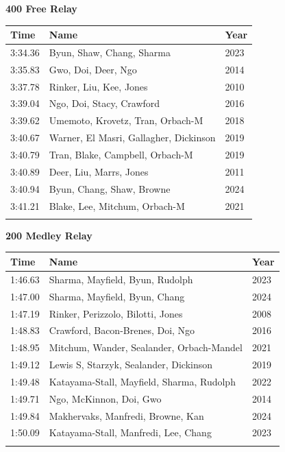 \noindent\begin{minipage}[t]{0.98\textwidth}
\centering
\textbf{\textcolor{teamprimary}{400 Free Relay}}\par
\vspace{0.5em}
\centering
\small
\renewcommand{\arraystretch}{1.0}
\setlength{\tabcolsep}{4pt}
\begin{tabular}{@{}p{4.5cm}p{8.5cm}p{2.5cm}@{}}
\toprule
\textbf{Time} & \textbf{Name} & \textbf{Year} \\
\midrule
3:34.36 & Byun, Shaw, Chang, Sharma & 2023 \\
3:35.83 & Gwo, Doi, Deer, Ngo & 2014 \\
3:37.78 & Rinker, Liu, Kee, Jones & 2010 \\
3:39.04 & Ngo, Doi, Stacy, Crawford & 2016 \\
3:39.62 & Umemoto, Krovetz, Tran, Orbach-M & 2018 \\
3:40.67 & Warner, El Masri, Gallagher, Dickinson & 2019 \\
3:40.79 & Tran, Blake, Campbell, Orbach-M & 2019 \\
3:40.89 & Deer, Liu, Marrs, Jones & 2011 \\
3:40.94 & Byun, Chang, Shaw, Browne & 2024 \\
3:41.21 & Blake, Lee, Mitchum, Orbach-M & 2021 \\
\bottomrule
\vspace{0.5em}
\end{tabular}
\end{minipage}
\vspace{1.2em}
\noindent\begin{minipage}[t]{0.98\textwidth}
\centering
\textbf{\textcolor{teamprimary}{200 Medley Relay}}\par
\vspace{0.5em}
\centering
\small
\renewcommand{\arraystretch}{1.0}
\setlength{\tabcolsep}{4pt}
\begin{tabular}{@{}p{4.5cm}p{8.5cm}p{2.5cm}@{}}
\toprule
\textbf{Time} & \textbf{Name} & \textbf{Year} \\
\midrule
1:46.63 & Sharma, Mayfield, Byun, Rudolph & 2023 \\
1:47.00 & Sharma, Mayfield, Byun, Chang & 2024 \\
1:47.19 & Rinker, Perizzolo, Bilotti, Jones & 2008 \\
1:48.83 & Crawford, Bacon-Brenes, Doi, Ngo & 2016 \\
1:48.95 & Mitchum, Wander, Sealander, Orbach-Mandel & 2021 \\
1:49.12 & Lewis S, Starzyk, Sealander, Dickinson & 2019 \\
1:49.48 & Katayama-Stall, Mayfield, Sharma, Rudolph & 2022 \\
1:49.71 & Ngo, McKinnon, Doi, Gwo & 2014 \\
1:49.84 & Makhervaks, Manfredi, Browne, Kan & 2024 \\
1:50.09 & Katayama-Stall, Manfredi, Lee, Chang & 2023 \\
\bottomrule
\vspace{0.5em}
\end{tabular}
\end{minipage}
\clearpage

